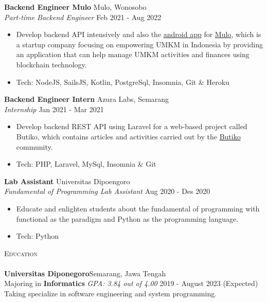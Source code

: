 \documentclass[a4paper]{article}
\newcommand{\lineunder} {
    \vspace*{-8pt} \\
    \hspace*{-18pt} \hrulefill \\
}
\newcommand{\header} [1] {
    {\hspace*{-18pt}\vspace*{6pt} \textsc{#1}}
    \vspace*{-6pt} \lineunder
}
\begin{document}
\textbf{Backend Engineer Mulo} \hfill Mulo, Wonosobo\\
\textit{Part-time Backend Engineer} \hfill Feb 2021 - Aug 2022\\
\vspace{-1mm}
\begin{itemize} \itemsep 1pt
	\item Develop backend API intensively and also the \href{https://play.google.com/store/apps/details?id=app.mulo}{android app} for \href{https://muloapp.id/}{Mulo}, which is a startup company focusing on empowering UMKM in Indonesia by providing an application that can help manage UMKM activities and finances using blockchain technology.
	\item Tech: NodeJS, SailsJS, Kotlin, PostgreSql, Insomnia, Git \& Heroku
\end{itemize}

\textbf{Backend Engineer Intern} \hfill Azura Labs, Semarang\\
\textit{Internship} \hfill Jan 2021 - Mar 2021\\
\vspace{-1mm}
\begin{itemize} \itemsep 1pt
	\item Develop backend REST API using Laravel for a web-based project called \textquotesingle{}Butiko\textquotesingle{}, which contains articles and activities carried out by the \textquotesingle{}\href{https://butiko.id/}{Butiko}\textquotesingle{} community.
	\item Tech: PHP, Laravel, MySql, Insomnia \& Git
\end{itemize}

\textbf{Lab Assistant} \hfill Universitas Dipoengoro\\
\textit{Fundamental of Programming Lab Assistant} \hfill Aug 2020 - Des 2020\\
\vspace{-1mm}
\begin{itemize} \itemsep 1pt
	\item Educate and enlighten students about the fundamental of programming with functional as the paradigm and Python as the programming language.
	\item Tech: Python
\end{itemize}

\header{Education}
\textbf{Universitas Diponegoro}\hfill Semarang, Jawa Tengah\\
Majoring in \textbf{Informatics} \textit{GPA: 3.84 out of 4.00} \hfill 2019 - August 2023 (Expected)\\
Taking specialize in software engineering and system programming.
\vspace{2mm}
\end{document}
